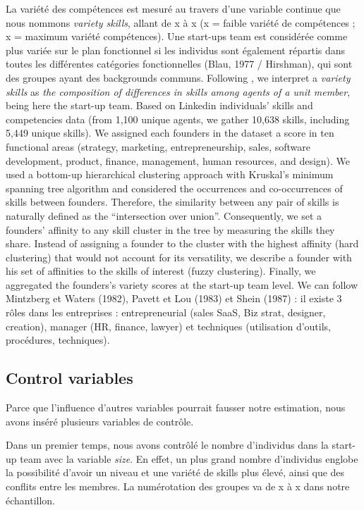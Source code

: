 \documentclass[12pt]{article}
\begin{document}
La variété des compétences est mesuré au travers d'une variable continue que nous nommons \textit{variety skills}, allant de x à x (x = faible variété de compétences ; x = maximum variété compétences). Une start-ups team est considérée comme plus variée sur le plan fonctionnel si les individus sont également répartis dans toutes les différentes catégories fonctionnelles (Blau, 1977 / Hirshman), qui sont des groupes ayant des backgrounds communs. Following \citet{harrison2007s}, we interpret a \textit{variety skills} as \textit{the composition of differences in skills among agents of a unit member}, being here the start-up team. Based on Linkedin individuals' skills and competencies data (from 1,100 unique agents, we gather 10,638 skills, including 5,449 unique skills). We assigned each founders in the dataset a score in ten functional areas (strategy, marketing, entrepreneurship, sales, software development, product, finance, management, human resources, and design). We used a bottom-up hierarchical clustering approach with Kruskal's minimum spanning tree algorithm \citep{kruskal1956shortest} and considered the occurrences and co-occurrences of skills between founders. Therefore, the similarity between any pair of skills is naturally defined as the “intersection over union”. Consequently, we set a founders' affinity to any skill cluster in the tree by measuring the skills they share. Instead of assigning a founder to the cluster with the highest affinity (hard clustering) that would not account for its versatility, we describe a founder with his set of affinities to the skills of interest (fuzzy clustering). Finally, we aggregated the founders's variety scores at the start-up team level. We can follow Mintzberg et Waters (1982), Pavett et Lou (1983) et Shein (1987) : il existe 3 rôles dans les entreprises : entrepreneurial (sales SaaS, Biz strat, designer, creation), manager (HR, finance, lawyer) et techniques (utilisation d'outils, procédures, techniques).

\subsection{Control variables}

Parce que l'influence d'autres variables pourrait fausser notre estimation, nous avons inséré plusieurs variables de contrôle.

Dans un premier temps, nous avons contrôlé le nombre d'individus dans la start-up team avec la variable \textit{size}. En effet, un plus grand nombre d'individus englobe la possibilité d'avoir un niveau et une variété de skills plus élevé, ainsi que des conflits entre les membres. La numérotation des groupes va de x à x dans notre échantillon.
\end{document}
